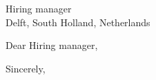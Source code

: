 \documentclass[10pt,letter]{letter}
\def\hm{ Hiring manager} %
\begin{document}
    \begin{letter}{\hm \\ Delft, South Holland, Netherlands }
\opening{Dear \hm,}

\setlength\parindent{.5in}



 

\closing{Sincerely,}
\end{letter}
\end{document}
